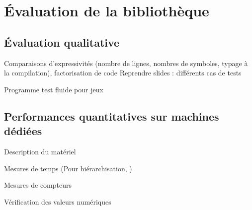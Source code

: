 
\chapter{\'Evaluation de la bibliothèque}


\section{\'Evaluation qualitative}

Comparaisons d'expressivités (nombre de lignes, nombres de symboles, typage à la compilation), factorisation de code
Reprendre slides : différents cas de tests

Programme test fluide pour jeux \cite{Art15}


\section{Performances quantitatives sur machines dédiées}

Description du matériel

Mesures de temps
(Pour hiérarchisation, \cite{Ths3,Ths4})

Mesures de compteurs

Vérification des valeurs numériques
